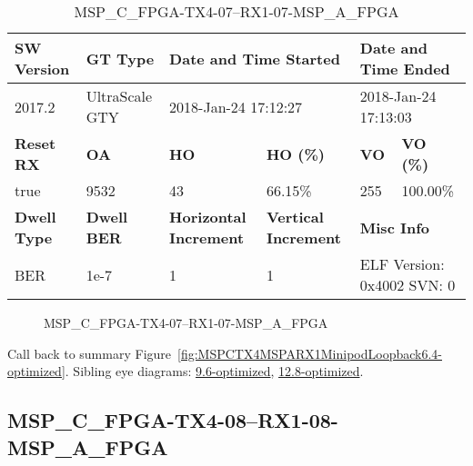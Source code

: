 \begin{table}[h]
\centering
\caption{MSP\_C\_FPGA-TX4-07--RX1-07-MSP\_A\_FPGA}
\label{tab:MSPCFPGATX407RX107MSPAFPGA6.4-optimized}
\begin{tabular}{@{}|l|l|l|l|l|l|@{}}
\toprule
\textbf{SW Version}                & \textbf{GT Type}   & \multicolumn{2}{l|}{\textbf{Date and Time Started}}            & \multicolumn{2}{l|}{\textbf{Date and Time Ended}}        \\ \midrule
2017.2                       & UltraScale GTY          & \multicolumn{2}{l|}{2018-Jan-24 17:12:27}                   & \multicolumn{2}{l|}{2018-Jan-24 17:13:03}               \\ \midrule
\textbf{Reset RX}                  & \textbf{OA} & \textbf{HO}   & \textbf{HO (\%)} & \textbf{VO} & \textbf{VO (\%)} \\ \midrule
true & 9532        & 43          & 66.15\%        & 255        & 100.00\%       \\ \midrule
\textbf{Dwell Type}                & \textbf{Dwell BER} & \textbf{Horizontal Increment} & \textbf{Vertical Increment}    & \multicolumn{2}{l|}{\textbf{Misc Info}}                  \\ \midrule
BER                            & 1e-7        & 1        & 1           & \multicolumn{2}{l|}{ELF Version: 0x4002 SVN: 0}                         \\ \bottomrule
\end{tabular}
\end{table}

\begin{figure}[h]
\caption{MSP\_C\_FPGA-TX4-07--RX1-07-MSP\_A\_FPGA} \label{fig:MSPCFPGATX407RX107MSPAFPGA6.4-optimized}
\end{figure}

Call back to summary Figure~\ref{fig:MSPCTX4MSPARX1MinipodLoopback6.4-optimized}.
Sibling eye diagrams: \hyperref[sec:MSPCFPGATX407RX107MSPAFPGA9.6-optimized]{9.6-optimized}, \hyperref[sec:MSPCFPGATX407RX107MSPAFPGA12.8-optimized]{12.8-optimized}.

\clearpage
\newpage


\subsection{MSP\_C\_FPGA-TX4-08--RX1-08-MSP\_A\_FPGA}\label{sec:MSPCFPGATX408RX108MSPAFPGA6.4-optimized}

